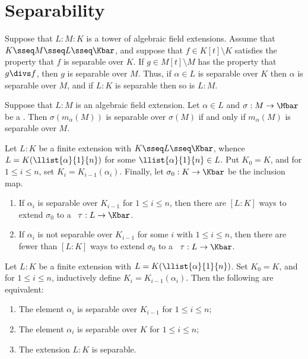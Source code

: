 \documentclass{article}
\begin{document}
\section{Separability}
  \begin{tproposition}
    Suppose that $L:M:K$ is a tower of algebraic field extensions. Assume that $K\sseq M\sseq L\sseq \Kbar$, and suppose that $f\in K[t]\setminus K$ satisfies the property that $f$ is separable over $K$. If $g\in M[t]\setminus M$ has the property that $g\divs f$, then $g$ is separable over $M$. Thus, if $\alpha\in L$ is separable over $K$ then $\alpha$ is separable over $M$, and if $L:K$ is separable then so is $L:M$.
  \end{tproposition}

  \begin{tproposition}
    Suppose that $L:M$ is an algebraic field extension. Let $\alpha\in L$ and $\sigma:M\to\Mbar$ be a \homo. Then $\sigma(m_\alpha(M))$ is separable over $\sigma(M)$ if and only if $m_\alpha(M)$ is separable over $M$.
  \end{tproposition}

  \begin{ttheorem}
    Let $L:K$ be a finite extension with $K\sseq L\sseq \Kbar$, whence $L=K(\llist{\alpha}{1}{n})$ for some $\llist{\alpha}{1}{n}\in L$. Put $K_0=K$, and for $1\leq i\leq n$, set $K_i=K_{i-1}(\alpha_i)$. Finally, let $\sigma_0:K\to\Kbar$ be the inclusion map.
    \begin{enumerate}[label=(\roman*)]
      \item If $\alpha_i$ is separable over $K_{i-1}$ for $1\leq i\leq n$, then there are $[L:K]$ ways to extend $\sigma_0$ to a \homo~$\tau:L\to\Kbar$.
      \item If $\alpha_i$ is not separable over $K_{i-1}$ for some $i$ with $1\leq i\leq n$, then there are fewer than $[L:K]$ ways to extend $\sigma_0$ to a \homo~$\tau:L\to\Kbar$.
    \end{enumerate}
  \end{ttheorem}

  \begin{ttheorem}
    Let $L:K$ be a finite extension with $L=K(\llist{\alpha}{1}{n})$. Set $K_0=K$, and for $1\leq i\leq n$, inductively define $K_i=K_{i-1}(\alpha_i)$. Then the following are equivalent:
    \begin{enumerate}[label=(\roman*)]
      \item The element $\alpha_i$ is separable over $K_{i-1}$ for $1\leq i\leq n$;
      \item The element $\alpha_i$ is separable over $K$ for $1\leq i\leq n$;
      \item The extension $L:K$ is separable.
    \end{enumerate}
  \end{ttheorem}
\end{document}
